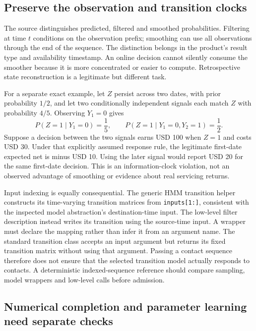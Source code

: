 \subsection{Preserve the observation and transition clocks}
\label{exec19:dynamax-clocks}

The source distinguishes predicted, filtered and smoothed probabilities.
Filtering at time $t$ conditions on the observation prefix; smoothing can use
all observations through the end of the sequence. The distinction belongs in
the product's result type and availability timestamp. An online decision cannot
silently consume the smoother because it is more concentrated or easier to
compute. Retrospective state reconstruction is a legitimate but different task.
\citep{exec19_dynamax_source}

For a separate exact example, let $Z$ persist across two dates, with prior
probability $1/2$, and let two conditionally independent signals each match $Z$
with probability $4/5$. Observing $Y_1=0$ gives
\begin{equation}
 P(Z=1\mid Y_1=0)=\frac15,\qquad
 P(Z=1\mid Y_1=0,Y_2=1)=\frac12.
 \label{exec19:dynamax-filter}
\end{equation}
Suppose a decision between the two signals earns USD 100 when $Z=1$ and costs
USD 30. Under that explicitly assumed response rule, the legitimate first-date
expected net is minus USD 10. Using the later signal would report USD 20 for
the same first-date decision. This is an information-clock violation, not an
observed advantage of smoothing or evidence about real servicing returns.
\citep{exec19_dynamax_reference}

Input indexing is equally consequential. The generic HMM transition helper
constructs its time-varying transition matrices from \texttt{inputs[1:]},
consistent with the inspected model abstraction's destination-time input.
The low-level filter description instead writes its transition using the
source-time input. A wrapper must declare the mapping rather than infer it from
an argument name. The standard transition class accepts an input argument but
returns its fixed transition matrix without using that argument. Passing a
contact sequence therefore does not ensure that the selected transition model
actually responds to contacts. A deterministic indexed-sequence reference
should compare sampling, model wrappers and low-level calls before admission.
\citep{exec19_dynamax_source}

\subsection{Numerical completion and parameter learning need separate checks}
\label{exec19:dynamax-numerics}

